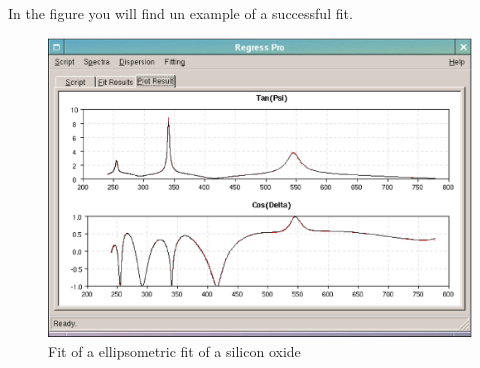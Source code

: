 \documentclass[a4paper]{report}
\begin{document}
In the figure you will find un example of a successful fit.
\begin{figure}[!thp]
  \includegraphics[width=\textwidth]{figure/oxide-fit-1.eps}
  \caption{Fit of a ellipsometric fit of a silicon oxide}
\end{figure}
\end{document}
